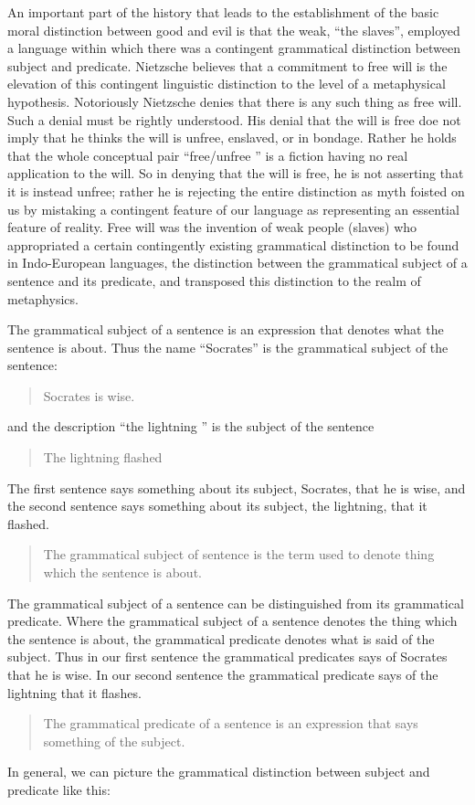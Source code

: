 An important part of the history that leads to the establishment of the basic moral distinction between good and evil is that the weak, ``the slaves'', employed a language within which there was a contingent grammatical distinction between subject and predicate. Nietzsche believes that a commitment to free will is the elevation of this contingent linguistic distinction to the level of a metaphysical hypothesis. Notoriously Nietzsche denies that there is any such thing as free will. Such a denial must be rightly understood. His denial that the will is free doe not imply that he thinks the will is unfree, enslaved, or in bondage. Rather he holds that the whole conceptual pair  ``free/unfree '' is a fiction having no real application to the will. So in denying that the will is free, he is not asserting that it is instead unfree; rather he is rejecting the entire distinction as myth foisted on us by mistaking a contingent feature of our language as representing an essential feature of reality. Free will was the invention of weak people (slaves) who appropriated a certain contingently existing grammatical distinction to be found in Indo-European languages, the distinction between the grammatical subject of a sentence and its predicate, and transposed this distinction to the realm of metaphysics.

The grammatical subject of a sentence is an expression that denotes what the sentence is about. Thus the name ``Socrates'' is the grammatical subject of the sentence:
\begin{quote}
    Socrates is wise.
\end{quote}
and the description ``the lightning '' is the subject of the sentence
\begin{quote}
    The lightning flashed
\end{quote}
The first sentence says something about its subject, Socrates, that he is wise, and the second sentence says something about its subject, the lightning, that it flashed.
\begin{quote}
    The grammatical subject of sentence is the term used to denote thing which the sentence is about. 
\end{quote}

The grammatical subject of a sentence can be distinguished from its grammatical predicate. Where the grammatical subject of a sentence denotes the thing which the sentence is about, the grammatical predicate denotes what is said of the subject. Thus in our first sentence the grammatical predicates says of Socrates that he is wise. In our second sentence the grammatical predicate says of the lightning that it flashes.
\begin{quote}
    The grammatical predicate of a sentence is an expression that says something of the subject.
\end{quote}
In general, we can picture the grammatical distinction between subject and predicate like this:


